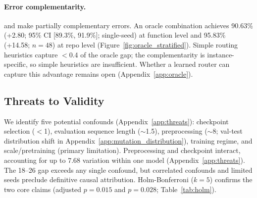 \paragraph{Error complementarity.} \cls{} and \cwm{} make partially complementary errors. An oracle combination achieves 90.63\% (+2.80\pp{}; 95\% CI [89.3\%, 91.9\%]; single-seed) at function level and 95.83\% (+14.58\pp{}; $n{=}48$) at repo level (Figure~\ref{fig:oracle_stratified}). Simple routing heuristics capture $<$0.4\pp{} of the oracle gap; the complementarity is instance-specific, so simple heuristics are insufficient. Whether a learned router can capture this advantage remains open (Appendix~\ref{app:oracle}).

\subsection{Threats to Validity}
\label{sec:threats}

We identify five potential confounds (Appendix~\ref{app:threats}): checkpoint selection ($<$1\pp{}), evaluation sequence length (${\sim}$1.5\pp{}), preprocessing (${\sim}$8\pp{}; val-test distribution shift in Appendix~\ref{app:mutation_distribution}), \traj{} training regime, and \cwm{} scale/pretraining (primary limitation). Preprocessing and checkpoint interact, accounting for up to 7.68\pp{} variation within one model (Appendix~\ref{app:threats}). The 18--26\pp{} gap exceeds any single confound, but correlated confounds and limited seeds preclude definitive causal attribution. Holm-Bonferroni ($k{=}5$) confirms the two core claims (adjusted $p{=}0.015$ and $p{=}0.028$; Table~\ref{tab:holm}).

\begin{table}[t]
\centering
\small
\caption{Holm-Bonferroni correction for primary comparisons ($k{=}5$). Comparisons ranked by raw $p$-value; each tested against $\alpha / (k - \text{rank} + 1)$.}
\label{tab:holm}
\setlength{\tabcolsep}{3pt}
\end{table}
